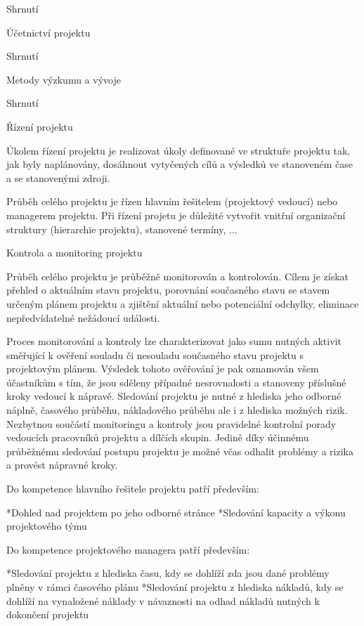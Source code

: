 \sec Shrnutí

\chap Účetnictví projektu

\sec Shrnutí

\chap Metody výzkumu a vývoje

\sec Shrnutí

\chap Řízení projektu

Úkolem řízení projektu je realizovat úkoly definované ve struktuře projektu tak, jak byly naplánovány, dosáhnout vytyčených cílů a výsledků ve stanoveném čase a se stanovenými zdroji.

Průběh celého projektu je řízen hlavním řešitelem (projektový vedoucí) nebo managerem projektu. Při řízení projetu je důležité vytvořit vnitřní organizační struktury (hierarchie projektu), stanovené termíny, ...

\sec Kontrola a monitoring projektu

Průběh celého projektu je průběžně monitorován a kontrolován. Cílem je získat přehled o aktuálním stavu projektu, porovnání současného stavu se stavem určeným plánem projektu a zjištění aktuální nebo potenciální odchylky, eliminace nepředvídatelné nežádoucí události.

Proces monitorování a kontroly lze charakterizovat jako sumu nutných aktivit směřující k ověření souladu či nesouladu současného stavu projektu s projektovým plánem. Výsledek tohoto ověřování je pak oznamován všem účastníkům s tím, že jsou sděleny případné nesrovnalosti a stanoveny příslušné kroky vedoucí k nápravě. Sledování projektu je nutné z hlediska jeho odborné náplně, časového průběhu, nákladového průběhu ale i z hlediska možných rizik. Nezbytnou součástí monitoringu a kontroly jsou pravidelné kontrolní porady vedoucích pracovníků projektu a dílčích skupin. Jedině díky účinnému průběžnému sledování postupu projektu je možné včas odhalit problémy a rizika a provést nápravné kroky.

Do kompetence hlavního řešitele projektu patří především:

\begitems
*Dohled nad projektem po jeho odborné stránce
*Sledování kapacity a výkonu projektového týmu
\enditems

Do kompetence projektového managera patří především:

\begitems
*Sledování projektu z hlediska času, kdy se dohlíží zda jsou dané problémy plněny v rámci časového plánu
*Sledování projektu z hlediska nákladů, kdy se dohlíží na vynaložené náklady v návaznosti na odhad nákladů nutných k dokončení projektu
\enditems


